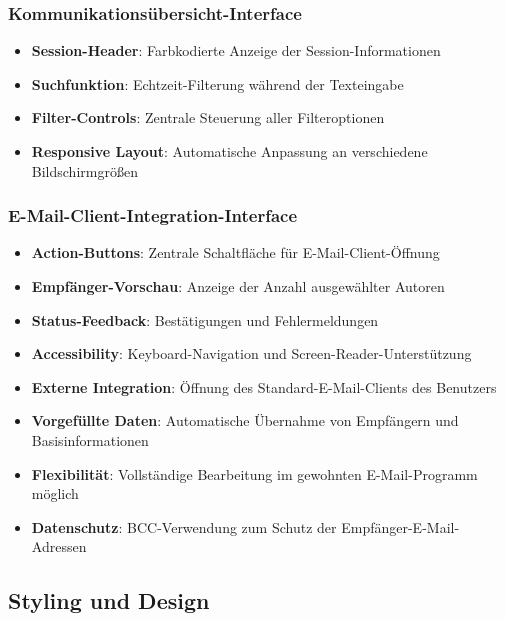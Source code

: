 \documentclass[11pt,a4paper]{article}
\begin{document}
\subsubsection{Kommunikationsübersicht-Interface}
\begin{itemize}
    \item \textbf{Session-Header}: Farbkodierte Anzeige der Session-Informationen
    \item \textbf{Suchfunktion}: Echtzeit-Filterung während der Texteingabe
    \item \textbf{Filter-Controls}: Zentrale Steuerung aller Filteroptionen
    \item \textbf{Responsive Layout}: Automatische Anpassung an verschiedene Bildschirmgrößen
\end{itemize}

\subsubsection{E-Mail-Client-Integration-Interface}
\begin{itemize}
    \item \textbf{Action-Buttons}: Zentrale Schaltfläche für E-Mail-Client-Öffnung
    \item \textbf{Empfänger-Vorschau}: Anzeige der Anzahl ausgewählter Autoren
    \item \textbf{Status-Feedback}: Bestätigungen und Fehlermeldungen
    \item \textbf{Accessibility}: Keyboard-Navigation und Screen-Reader-Unterstützung
\end{itemize}
\begin{itemize}
    \item \textbf{Externe Integration}: Öffnung des Standard-E-Mail-Clients des Benutzers
    \item \textbf{Vorgefüllte Daten}: Automatische Übernahme von Empfängern und Basisinformationen
    \item \textbf{Flexibilität}: Vollständige Bearbeitung im gewohnten E-Mail-Programm möglich
    \item \textbf{Datenschutz}: BCC-Verwendung zum Schutz der Empfänger-E-Mail-Adressen
\end{itemize}

\subsection{Styling und Design}
\end{document}
